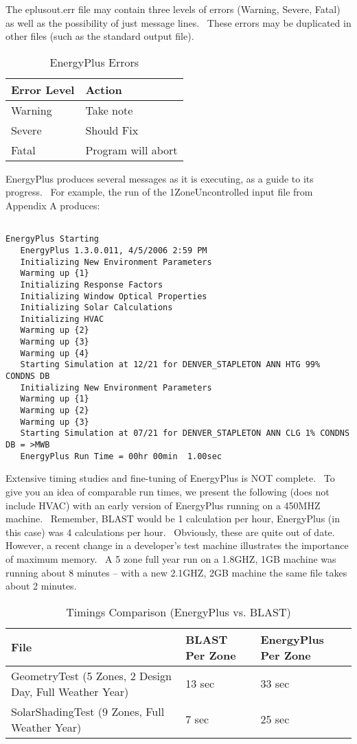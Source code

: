 The eplusout.err file may contain three levels of errors (Warning, Severe, Fatal) as well as the possibility of just message lines.~ These errors may be duplicated in other files (such as the standard output file).

\begin{longtable}[c]{@{}ll@{}}
\caption{  EnergyPlus Errors \protect \label{table:energyplus-errors}}\\
\toprule 
Error Level & Action \tabularnewline \midrule
\endhead
Warning & Take note \tabularnewline
Severe & Should Fix \tabularnewline
Fatal & Program will abort \tabularnewline
\bottomrule
\end{longtable}

EnergyPlus produces several messages as it is executing, as a guide to its progress.~ For example, the run of the 1ZoneUncontrolled input file from Appendix A produces:

\begin{lstlisting}

EnergyPlus Starting
   EnergyPlus 1.3.0.011, 4/5/2006 2:59 PM
   Initializing New Environment Parameters
   Warming up {1}
   Initializing Response Factors
   Initializing Window Optical Properties
   Initializing Solar Calculations
   Initializing HVAC
   Warming up {2}
   Warming up {3}
   Warming up {4}
   Starting Simulation at 12/21 for DENVER_STAPLETON ANN HTG 99% CONDNS DB
   Initializing New Environment Parameters
   Warming up {1}
   Warming up {2}
   Warming up {3}
   Starting Simulation at 07/21 for DENVER_STAPLETON ANN CLG 1% CONDNS DB = >MWB
   EnergyPlus Run Time = 00hr 00min  1.00sec
\end{lstlisting}

Extensive timing studies and fine-tuning of EnergyPlus is NOT complete.~ To give you an idea of comparable run times, we present the following (does not include HVAC) with an early version of EnergyPlus running on a 450MHZ machine.~ Remember, BLAST would be 1 calculation per hour, EnergyPlus (in this case) was 4 calculations per hour.~ Obviously, these are quite out of date.~ However, a recent change in a developer's test machine illustrates the importance of maximum memory.~ A 5 zone full year run on a 1.8GHZ, 1GB machine was running about 8 minutes -- with a new 2.1GHZ, 2GB machine the same file takes about 2 minutes.

\begin{longtable}[c]{p{3.0in}p{1.5in}p{1.5in}}
\caption{  Timings Comparison (EnergyPlus vs. BLAST) \protect \label{table:timings-comparison-energyplus-vs.-blast}}\\
\toprule 
File & BLAST Per Zone & EnergyPlus Per Zone \tabularnewline \midrule
\endhead
GeometryTest (5 Zones, 2 Design Day, Full Weather Year) & 13 sec & 33 sec \tabularnewline
SolarShadingTest (9 Zones, Full Weather Year) & 7 sec & 25 sec \tabularnewline
\bottomrule
\end{longtable}
